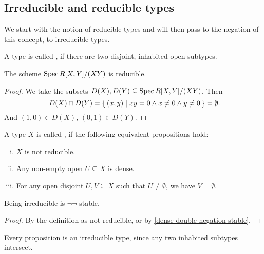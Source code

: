 \subsection{Irreducible and reducible types}

We start with the notion of reducible types and will then pass to the negation of this concept, to irreducible types.

\begin{definition}
  A type is called , if there are two disjoint, inhabited open subtypes.
\end{definition}

\begin{proposition}
  The scheme $\operatorname{Spec} R[X,Y]/(XY)$ is reducible.
\end{proposition}

\begin{proof}
  We take the subsets $D(X),D(Y)\subseteq \operatorname{Spec} R[X,Y]/(XY)$.
  Then
  \[ D(X)\cap D(Y)=\{\,(x,y)\mid xy=0\wedge x\neq 0\wedge y\neq 0\,\}=\emptyset\rlap{.} \]
  And $(1,0)\in D(X)$, $(0,1)\in D(Y)$.
\end{proof}

\begin{definition}%
  \label{irred}
  A type $X$ is called ,
  if the following equivalent propositions hold:
  \begin{enumerate}[(i)]
  \item $X$ is not reducible.
  \item Any non-empty open $U\subseteq X$ is dense.
  \item For any open disjoint $U,V\subseteq X$ such that $U\neq\emptyset$, we have $V=\emptyset$.
  \end{enumerate}
\end{definition}

\begin{proposition}%
  \label{irred-double-negation-stable}
  Being irreducible is $\neg\neg$-stable.
\end{proposition}

\begin{proof}
  By the definition as not reducible,
  or by \cref{dense-double-negation-stable}.
\end{proof}

\begin{example}
  Every proposition is an irreducible type,
  since any two inhabited subtypes intersect.
\end{example}

